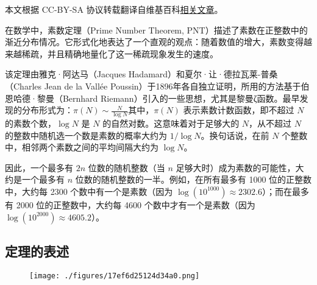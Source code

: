 
本文根据 CC-BY-SA 协议转载翻译自维基百科\href{https://en.wikipedia.org/wiki/Prime_number_theorem}{相关文章}。

在数学中，素数定理（Prime Number Theorem, PNT）描述了素数在正整数中的渐近分布情况。它形式化地表达了一个直观的观点：随着数值的增大，素数变得越来越稀疏，并且精确地量化了这一稀疏现象发生的速度。

该定理由雅克·阿达马（Jacques Hadamard）和夏尔·让·德拉瓦莱-普桑（Charles Jean de la Vallée Poussin）于1896年各自独立证明，所用的方法基于伯恩哈德·黎曼（Bernhard Riemann）引入的一些思想，尤其是黎曼ζ函数。最早发现的分布形式为：$\pi(N) \sim \frac{N}{\log N}$其中，$\pi(N)$ 表示素数计数函数，即不超过 $N$ 的素数个数，$\log N$ 是 $N$ 的自然对数。这意味着对于足够大的 $N$，从不超过 $N$ 的整数中随机选一个数是素数的概率大约为 $1 / \log N$。换句话说，在前 $N$ 个整数中，相邻两个素数之间的平均间隔大约为 $\log N$。

因此，一个最多有 $2n$ 位数的随机整数（当 $n$ 足够大时）成为素数的可能性，大约是一个最多有 $n$ 位数的随机整数的一半。例如，在所有最多有 1000 位的正整数中，大约每 2300 个数中有一个是素数（因为 $\log(10^{1000}) \approx 2302.6$）；而在最多有 2000 位的正整数中，大约每 4600 个数中才有一个是素数（因为 $\log(10^{2000}) \approx 4605.2$）。
\subsection{定理的表述}
\begin{figure}[ht]
\centering
\texttt{[image: ./figures/17ef6d25124d34a0.png]}
\caption{} \label{fig_SDL_1}
\end{figure}